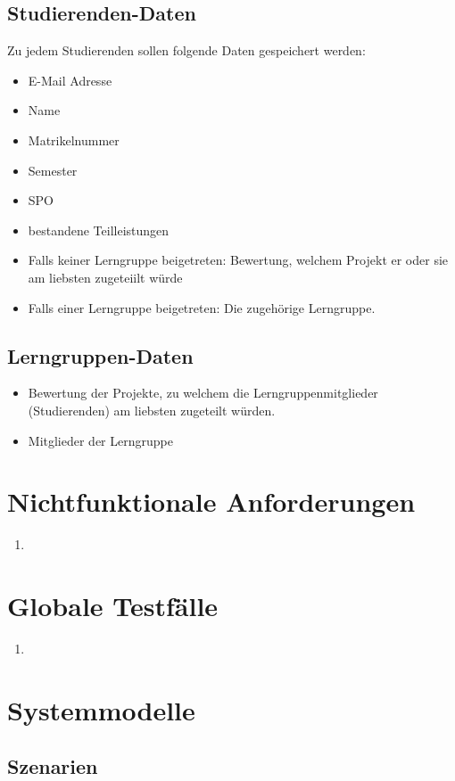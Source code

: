 \documentclass[parskip=full]{scrartcl}
\begin{document}
\subsection{Studierenden-Daten} 
Zu jedem Studierenden sollen folgende Daten gespeichert werden:
\begin{itemize} 
  \item E-Mail Adresse
  \item Name
  \item Matrikelnummer
  \item Semester
  \item SPO
  \item bestandene Teilleistungen
  \item Falls keiner Lerngruppe beigetreten: Bewertung, welchem Projekt er oder
  sie am liebsten zugeteiilt würde
  \item Falls einer Lerngruppe beigetreten: Die zugehörige Lerngruppe.
\end{itemize}
\subsection{Lerngruppen-Daten} 
\begin{itemize} 
  \item Bewertung der Projekte, zu welchem die Lerngruppenmitglieder
  (Studierenden) am liebsten zugeteilt würden.
  \item Mitglieder der Lerngruppe
\end{itemize}

\section{Nichtfunktionale Anforderungen}
\begin{enumerate}
  \item 
\end{enumerate}
\section{Globale Testfälle}
\begin{enumerate}
  \item 
\end{enumerate}
\section{Systemmodelle}

\subsection{Szenarien}
\end{document}

